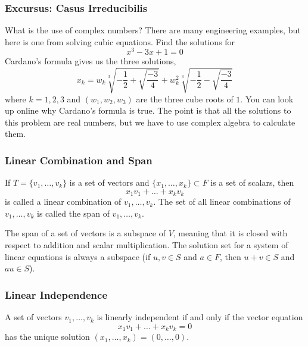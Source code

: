 \documentclass[xcolor=dvipsnames]{beamer}
\begin{document}
\begin{frame}
  \frametitle{Excursus: Casus Irreducibilis}
  What is the use of complex numbers? There are many engineering
  examples, but here is one from solving cubic equations. Find the
  solutions for
  \begin{equation}
    \label{eq:oozaechi}
    x^{3}-3x+1=0
  \end{equation}
  Cardano's formula gives us the three solutions,
  \begin{equation}
    \label{eq:iejopice}
    x_{k}=w_{k}\sqrt[3]{-\frac{1}{2}+\sqrt{\frac{-3}{4}}}+w_{k}^{2}\sqrt[3]{-\frac{1}{2}-\sqrt{\frac{-3}{4}}}
  \end{equation}
  where $k=1,2,3$ and $(w_{1},w_{2},w_{3})$ are the three cube roots
  of $1$. You can look up online why Cardano's formula is true. The
  point is that all the solutions to this problem are real numbers,
  but we have to use complex algebra to calculate them.
\end{frame}

\begin{frame}
  \frametitle{Linear Combination and Span}
  If $T=\{v_{1},{\ldots},v_{k}\}$ is a set of vectors and
  $\{x_{1},{\ldots},x_{k}\}\subset{}F$ is a set of scalars, then
  \begin{equation}
    \label{eq:aiveatah}
    x_{1}v_{1}+{\ldots}+x_{k}v_{k}
  \end{equation}
  is called a \alert{linear combination} of $v_{1},{\ldots},v_{k}$.
  The set of all linear combinations of $v_{1},{\ldots},v_{k}$ is
  called the \alert{span} of $v_{1},{\ldots},v_{k}$.

  \medskip

  The span of a set of vectors is a \alert{subspace} of $V$, meaning
  that it is closed with respect to addition and scalar
  multiplication. The solution set for a system of linear equations is
  always a subspace (if $u,v\in{}S$ and $a\in{}F$, then $u+v\in{}S$
  and $au\in{}S$).
\end{frame}

\begin{frame}
  \frametitle{Linear Independence}
  A set of vectors $v_{1},{\ldots},v_{k}$ is \alert{linearly
    independent} if and only if the vector equation
  \begin{equation}
    \label{eq:wohsiete}
    x_{1}v_{1}+{\ldots}+x_{k}v_{k}=0    
  \end{equation}
  has the unique solution $(x_{1},{\ldots},x_{k})=(0,{\ldots},0)$.
\end{frame}
\end{document}

